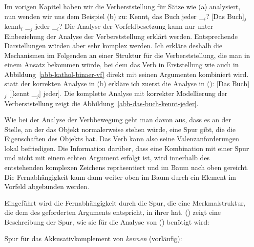 Im vorigen Kapitel haben wir die Verberststellung für Sätze wie (a) analysiert, nun wenden wir uns
dem Beispiel (b) zu:
\eal
\ex Kennt$_i$ das Buch jeder \_$_i$?
\ex {}[Das Buch]$_j$ kennt$_i$ \_$_j$ jeder \_$_i$?
\zl
Die Analyse der Vorfeldbesetzung kann nur unter Einbeziehung der Analyse der Verberststellung erklärt
werden. Entsprechende Darstellungen würden aber sehr komplex werden. Ich erkläre deshalb
die Mechanismen im Folgenden an einer Struktur für die Verberststellung, die man in einem
Ansatz %
bekommen würde, bei dem das Verb in Erststellung wie auch in Abbildung~\ref{abb-kathol-binaer-vf}
direkt mit seinen Argumenten kombiniert wird. \Dh statt der korrekten Analyse in (b) erkläre
ich zuerst die Analyse in ():
\ea
{}[Das Buch]$_j$ [[kennt \_$_j$] jeder].\label{ex-das-buch-kennt}
\z 
Die komplette Analyse mit korrekter Modellierung der Verberststellung zeigt
die Abbildung~\vref{abb-das-buch-kennt-jeder}.


Wie bei der Analyse der Verbbewegung geht man davon aus, dass es an der Stelle, an der
das Objekt normalerweise stehen würde, eine Spur gibt, die die Eigenschaften des Objekts
hat. Das Verb kann also seine Valenzanforderungen lokal befriedigen. Die Information darüber,
dass eine Kombination mit einer Spur und nicht mit einem echten Argument erfolgt ist,
wird innerhalb des entstehenden komplexen Zeichens repräsentiert und im Baum nach oben gereicht.
Die Fernabhängigkeit kann dann weiter oben im Baum durch ein Element im Vorfeld abgebunden werden.

Eingeführt wird die Fernabhängigkeit durch die Spur, die eine
Merkmalstruktur, die dem \localw des geforderten Arguments entspricht, in ihrer
\slashl hat. () zeigt eine Beschreibung der Spur, wie sie für die Analyse von () benötigt wird:

\eas
\label{le-spur-acc-o-kennen}%
Spur für das Akkusativkomplement von \emph{kennen} (vorläufig):\\[1mm]
\zs

